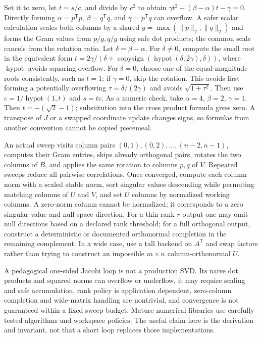 Set it to zero, let \(t=s/c\), and divide by \(c^2\) to obtain \(\gamma t^2+(\beta-\alpha)t-\gamma=0\). Directly forming \(\alpha=p^\mathsf Tp\), \(\beta=q^\mathsf Tq\), and \(\gamma=p^\mathsf Tq\) can overflow. A safer scalar calculation scales both columns by a shared \(g=\max(\|p\|_2,\|q\|_2)\) and forms the Gram values from \(p/g,q/g\) using safe dot products; the common scale cancels from the rotation ratio. Let \(\delta=\beta-\alpha\). For \(\delta\ne0\), compute the small root in the equivalent form \(t=2\gamma/(\delta+\operatorname{copysign}(\operatorname{hypot}(\delta,2\gamma),\delta))\), where \(\operatorname{hypot}\) avoids squaring overflow. For \(\delta=0\), choose one of the equal-magnitude roots consistently, such as \(t=1\); if \(\gamma=0\), skip the rotation. This avoids first forming a potentially overflowing \(\tau=\delta/(2\gamma)\) and avoids \(\sqrt{1+\tau^2}\). Then use \(c=1/\operatorname{hypot}(1,t)\) and \(s=tc\). As a numeric check, take \(\alpha=4\), \(\beta=2\), \(\gamma=1\). Then \(t=-(\sqrt2-1)\); substitution into the cross product formula gives zero. A transpose of \(J\) or a swapped coordinate update changes signs, so formulas from another convention cannot be copied piecemeal.

An actual sweep visits column pairs \((0,1),(0,2),\ldots,(n-2,n-1)\), computes their Gram entries, skips already orthogonal pairs, rotates the two columns of \(B\), and applies the same rotation to columns \(p,q\) of \(V\). Repeated sweeps reduce all pairwise correlations. Once converged, compute each column norm with a scaled stable norm, sort singular values descending while permuting matching columns of \(U\) and \(V\), and set \(U\) columns by normalized working columns. A zero-norm column cannot be normalized; it corresponds to a zero singular value and null-space direction. For a thin rank-\(r\) output one may omit null directions based on a declared rank threshold; for a full orthogonal output, construct a deterministic or documented orthonormal completion in the remaining complement. In a wide case, use a tall backend on \(A^\mathsf T\) and swap factors rather than trying to construct an impossible \(m\times n\) column-orthonormal \(U\).

A pedagogical one-sided Jacobi loop is not a production SVD. Its naive dot products and squared norms can overflow or underflow, it may require scaling and safe accumulation, rank policy is application dependent, zero-column completion and wide-matrix handling are nontrivial, and convergence is not guaranteed within a fixed sweep budget. Mature numerical libraries use carefully tested algorithms and workspace policies. The useful claim here is the derivation and invariant, not that a short loop replaces those implementations.

